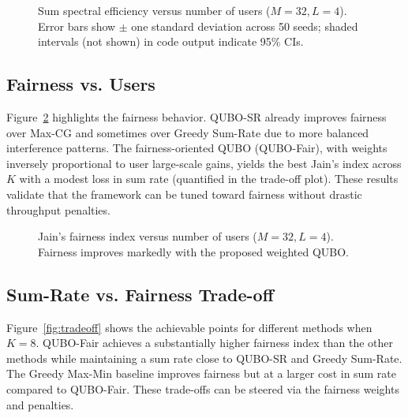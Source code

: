 \begin{figure}[htbp]
\centering
{}
\caption{Sum spectral efficiency versus number of users ($M=32, L=4$). Error bars show $\pm$ one standard deviation across 50 seeds; shaded intervals (not shown) in code output indicate 95\% CIs.}
\label{fig:sum_rate}
\end{figure}

\subsection{Fairness vs. Users}
Figure~\ref{fig:fairness} highlights the fairness behavior. QUBO-SR already improves fairness over Max-CG and sometimes over Greedy Sum-Rate due to more balanced interference patterns. The fairness-oriented QUBO (QUBO-Fair), with weights inversely proportional to user large-scale gains, yields the best Jain’s index across $K$ with a modest loss in sum rate (quantified in the trade-off plot). These results validate that the framework can be tuned toward fairness without drastic throughput penalties.

\begin{figure}[htbp]
\centering
{}
\caption{Jain’s fairness index versus number of users ($M=32, L=4$). Fairness improves markedly with the proposed weighted QUBO.}
\label{fig:fairness}
\end{figure}

\subsection{Sum-Rate vs. Fairness Trade-off}
Figure~\ref{fig:tradeoff} shows the achievable points for different methods when $K=8$. QUBO-Fair achieves a substantially higher fairness index than the other methods while maintaining a sum rate close to QUBO-SR and Greedy Sum-Rate. The Greedy Max-Min baseline improves fairness but at a larger cost in sum rate compared to QUBO-Fair. These trade-offs can be steered via the fairness weights and penalties.

